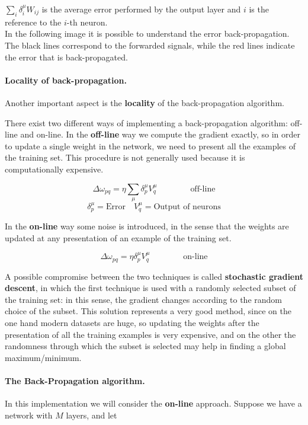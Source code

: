 $\sum_{i} \delta_{i}^{\mu} W_{ij}$ is the average error performed by the output layer and $i$ is the reference to the $i$-th neuron.\\
In the following image it is possible to understand the error back-propagation. The black lines correspond to the forwarded signals, while the red lines indicate the error that is back-propagated.

\paragraph*{Locality of back-propagation.} Another important aspect is the \textbf{locality} of the back-propagation algorithm.


There exist two different ways of implementing a back-propagation algorithm: off-line and on-line. In the \textbf{off-line} way we compute the gradient exactly, so in order to update a single weight in the network, we need to present all the examples of the training set. This procedure is not generally used because it is computationally expensive.

$$
\Delta \omega_{pq} = \eta \sum_{\mu} \delta_{p}^{\mu} V_{q}^{\mu} \qquad \qquad \text{off-line}
$$
$$
\delta_{p}^{\mu} = \text{Error} \quad V_{q}^{\mu} = \text{Output of neurons}
$$

In the \textbf{on-line} way some noise is introduced, in the sense that the weights are updated at any presentation of an example of the training set.

$$
\Delta \omega_{pq} = \eta\delta_ {p}^{\mu} V_{q}^{\mu} \qquad \qquad \text{on-line}
$$

A possible compromise between the two techniques is called \textbf{stochastic gradient descent}, in which the first technique is used with a randomly selected subset of the training set: in this sense, the gradient changes according to the random choice of the subset. This solution represents a very good method, since on the one hand modern datasets are huge, so updating the weights after the presentation of all the training examples is very expensive, and on the other the randomness through which the subset is selected may help in finding a global maximum/minimum.

\paragraph*{The Back-Propagation algorithm.} In this implementation we will consider the \textbf{on-line} approach. Suppose we have a network with $M$ layers, and let

